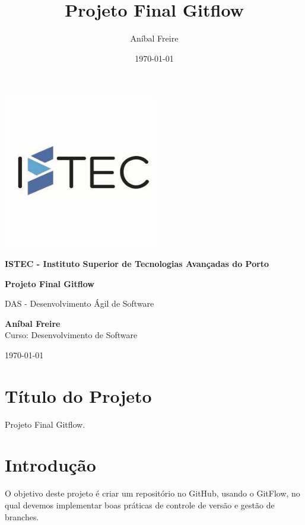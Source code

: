 \documentclass[a4paper,12pt]{article}
\title{\textbf{Projeto Final Gitflow}}
\author{Aníbal Freire}
\date{\today}
\begin{document}
\begin{titlepage}
    \centering
    \includegraphics[width=0.5\textwidth]{istec.jpeg} %
    \vspace{1cm}

    {\LARGE \textbf{ISTEC - Instituto Superior de Tecnologias Avançadas do Porto} \par}
    \vspace{1.5cm}

    {\Large \textbf{Projeto Final Gitflow} \par}
    \vspace{0.5cm}

    {\large DAS - Desenvolvimento Ágil de Software \par}
    \vspace{5cm}

    \textbf{Aníbal Freire} \\
    Curso: Desenvolvimento de Software \\

    \vfill

    {\large \today\par}
\end{titlepage}

\newpage
\tableofcontents
\newpage

\section{Título do Projeto}
Projeto Final Gitflow.

\section{Introdução}

O objetivo deste projeto é criar um repositório no GitHub, usando o GitFlow, no qual devemos implementar boas práticas de controle de versão e gestão de branches.
\end{document}
